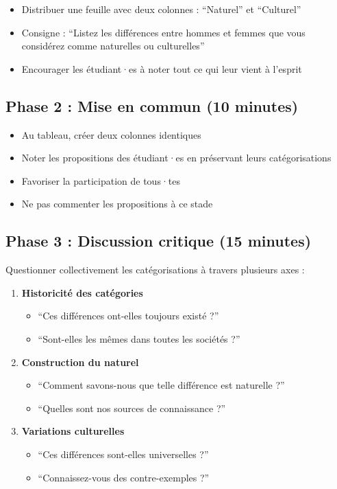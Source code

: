 \documentclass[
  letterpaper,
  DIV=11,
  numbers=noendperiod]{scrreprt}
\providecommand{\tightlist}{%
  \setlength{\itemsep}{0pt}\setlength{\parskip}{0pt}}\usepackage{longtable,booktabs,array}
\begin{document}
\begin{itemize}
\tightlist
\item
  Distribuer une feuille avec deux colonnes : ``Naturel'' et
  ``Culturel''
\item
  Consigne : ``Listez les différences entre hommes et femmes que vous
  considérez comme naturelles ou culturelles''
\item
  Encourager les étudiant·es à noter tout ce qui leur vient à l'esprit
\end{itemize}

\subsection{Phase 2 : Mise en commun (10
minutes)}\label{phase-2-mise-en-commun-10-minutes}

\begin{itemize}
\tightlist
\item
  Au tableau, créer deux colonnes identiques
\item
  Noter les propositions des étudiant·es en préservant leurs
  catégorisations
\item
  Favoriser la participation de tous·tes
\item
  Ne pas commenter les propositions à ce stade
\end{itemize}

\subsection{Phase 3 : Discussion critique (15
minutes)}\label{phase-3-discussion-critique-15-minutes}

Questionner collectivement les catégorisations à travers plusieurs axes
:

\begin{enumerate}
\def\labelenumi{\arabic{enumi}.}
\tightlist
\item
  \textbf{Historicité des catégories}

  \begin{itemize}
  \tightlist
  \item
    ``Ces différences ont-elles toujours existé ?''
  \item
    ``Sont-elles les mêmes dans toutes les sociétés ?''
  \end{itemize}
\item
  \textbf{Construction du naturel}

  \begin{itemize}
  \tightlist
  \item
    ``Comment savons-nous que telle différence est naturelle ?''
  \item
    ``Quelles sont nos sources de connaissance ?''
  \end{itemize}
\item
  \textbf{Variations culturelles}

  \begin{itemize}
  \tightlist
  \item
    ``Ces différences sont-elles universelles ?''
  \item
    ``Connaissez-vous des contre-exemples ?''
  \end{itemize}
\end{enumerate}
\end{document}
